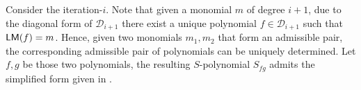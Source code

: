 \begin{algorithm}[t]
\caption{(\texttt{Spoly}) --- $S$-polynomials generation}\label{alg:step1}
\begin{algorithmic}[1]

     
\EndFor{}
\end{algorithmic}
\end{algorithm}

Consider the iteration-$i$. Note that given a monomial $m$ of degree \(i+1\), due to the diagonal form of $\mathcal{D}_{i+1}$ there exist a unique polynomial $f \in \mathcal{D}_{i+1}$ such that \(\mathsf{LM}(f) = m\). Hence, given two monomials $m_1, m_2$ that form an admissible pair, the corresponding admissible pair of polynomials can be uniquely determined. Let \(f,g\) be those two polynomials, the resulting $S$-polynomial \(S_{fg}\) admits the simplified form given in .

